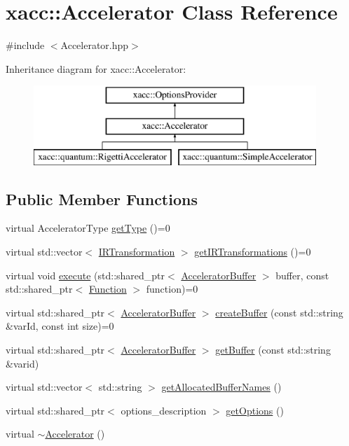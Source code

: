 \hypertarget{a01111}{}\section{xacc\+:\+:Accelerator Class Reference}
\label{a01111}


{\ttfamily \#include $<$Accelerator.\+hpp$>$}

Inheritance diagram for xacc\+:\+:Accelerator\+:\begin{figure}[H]
\begin{center}
\leavevmode
\includegraphics[height=3.000000cm]{a01111}
\end{center}
\end{figure}
\subsection*{Public Member Functions}
\begin{DoxyCompactItemize}
\item 
virtual Accelerator\+Type \hyperlink{a01111_aaffc3e4bb9880eb5041b1b58ee4c2665}{get\+Type} ()=0
\item 
virtual std\+::vector$<$ \hyperlink{a01179}{I\+R\+Transformation} $>$ \hyperlink{a01111_ad6e4a642dcb24e552675bcbeff1e1b04}{get\+I\+R\+Transformations} ()=0
\item 
virtual void \hyperlink{a01111_a89b3f3e6294f228abf03a410b0fb1674}{execute} (std\+::shared\+\_\+ptr$<$ \hyperlink{a01123}{Accelerator\+Buffer} $>$ buffer, const std\+::shared\+\_\+ptr$<$ \hyperlink{a01151}{Function} $>$ function)=0
\item 
virtual std\+::shared\+\_\+ptr$<$ \hyperlink{a01123}{Accelerator\+Buffer} $>$ \hyperlink{a01111_a064a2dbd58338364115c260267806945}{create\+Buffer} (const std\+::string \&var\+Id, const int size)=0
\item 
virtual std\+::shared\+\_\+ptr$<$ \hyperlink{a01123}{Accelerator\+Buffer} $>$ \hyperlink{a01111_ab3820be326e28a553fed1a824f4d41d0}{get\+Buffer} (const std\+::string \&varid)
\item 
virtual std\+::vector$<$ std\+::string $>$ \hyperlink{a01111_ae1463d7e405df89fa4af47e8922f4b82}{get\+Allocated\+Buffer\+Names} ()
\item 
virtual std\+::shared\+\_\+ptr$<$ options\+\_\+description $>$ \hyperlink{a01111_a98c9eda6b54367c75667ecfbbf167979}{get\+Options} ()
\item 
virtual \hyperlink{a01111_aed88ab0d71b765f0b0f512684ccd4b55}{$\sim$\+Accelerator} ()
\end{DoxyCompactItemize}
